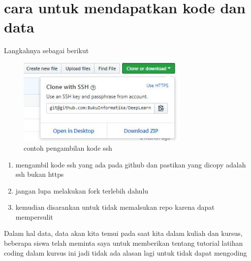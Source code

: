 \section{cara untuk mendapatkan kode dan data}
Langkahnya sebagai berikut
\begin{figure}[!htp]
	\includegraphics[width=0.75\textwidth]{figures/ssh.JPG}
	\caption{contoh pengambilan kode ssh}
	\label{labelgambar}
\end{figure}

\begin{enumerate}
\item mengambil kode ssh yang ada pada github dan pastikan yang dicopy adalah ssh bukan https
\item jangan lupa melakukan fork terlebih dahulu
\item kemudian disarankan untuk tidak memalsukan repo karena dapat mempersulit 
\end{enumerate}

Dalam hal data, data akan kita temui pada saat kita dalam kuliah dan kursus, beberapa siswa telah meminta saya untuk memberikan 
tentang tutorial latihan coding dalam kursus ini jadi tidak ada alasan lagi untuk tidak dapat mengoding

